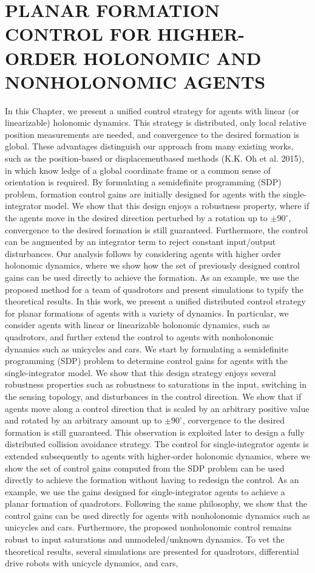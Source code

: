 \documentclass[10pt]{article}
\begin{document}
\section{PLANAR FORMATION CONTROL FOR HIGHER-ORDER HOLONOMIC AND NONHOLONOMIC AGENTS}
In this Chapter, we present a unified control strategy for agents with linear (or linearizable) holonomic dynamics. This strategy is distributed, only local relative position measurements are needed, and convergence to the desired formation is global. These advantages distinguish our approach from many existing works, such as the position-based or displacementbased methods (K.K. Oh et al. 2015), in which know ledge of a global coordinate frame or a common sense of orientation is required. By formulating a semidefinite programming (SDP) problem, formation control gains are initially designed for agents with the single-integrator model. We show that this design enjoys a robustness property, where if the agents move in the desired direction perturbed by a rotation up to $\pm 90^{\circ}$, convergence to the desired formation is still guaranteed. Furthermore, the control can be augmented by an integrator term to reject constant input/output disturbances. Our analysis follows by considering agents with higher order holonomic dynamics, where we show how the set of previously designed control gains can be used directly to achieve the formation. As an example, we use the proposed method for a team of quadrotors and present simulations to typify the theoretical results. In this work, we present a unified distributed control strategy for planar formations of agents with a variety of dynamics. In particular, we consider agents with linear or linearizable holonomic dynamics, such as quadrotors, and further extend the control to agents with nonholonomic dynamics such as unicycles and cars. We start by formulating a semidefinite programming (SDP) problem to determine control gains for agents with the single-integrator model. We show that this design strategy enjoys several robustness properties such as robustness to saturations in the input, switching in the sensing topology, and disturbances in the control direction. We show that if agents move along a control direction that is scaled by an arbitrary positive value and rotated by an arbitrary amount up to $\pm 90^{\circ}$, corvergence to the desired formation is still guaranteed. This observation is exploited later to design a fully distributed collision avoidance strategy. The control for single-integrator agents is extended subsequently to agents with higher-order holonomic dynamics, where we show the set of control gains computed from the SDP problem can be used directly to achieve the formation without having to redesign the control. As an example, we use the gains designed for single-integrator agents to achieve a planar formation of quadrotors. Following the same philosophy, we show that the control gains can be used directly for agents with nonholonomic dynamics such as unicycles and cars. Furthermore, the proposed nonholonomic control remains robust to input saturations and unmodeled/unknown dynamics. To vet the theoretical results, several simulations are presented for quadrotors, differential drive robots with unicycle dynamics, and cars, 
\end{document}
